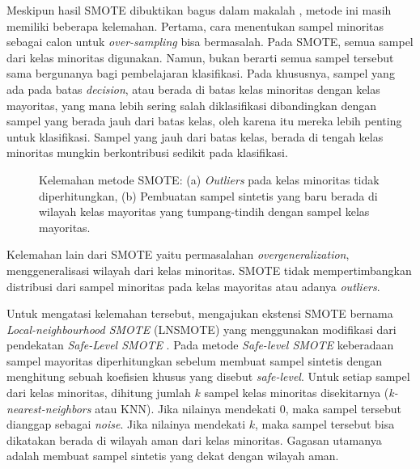 Meskipun hasil SMOTE dibuktikan bagus dalam makalah
\textcite{chawla2002smote}, metode ini masih memiliki beberapa kelemahan.
Pertama, cara menentukan sampel minoritas sebagai calon untuk
\textit{over-sampling} bisa bermasalah.
Pada SMOTE, semua sampel dari kelas minoritas digunakan.
Namun, bukan berarti semua sampel tersebut sama bergunanya bagi pembelajaran
klasifikasi.
Pada khususnya, sampel yang ada pada batas \textit{decision}, atau berada
di batas kelas minoritas dengan kelas mayoritas, yang mana lebih sering salah
diklasifikasi dibandingkan dengan sampel yang berada jauh dari batas kelas,
oleh karena itu mereka lebih penting untuk klasifikasi.
Sampel yang jauh dari batas kelas, berada di tengah kelas minoritas mungkin
berkontribusi sedikit pada klasifikasi.

\begin{figure}[htbp]
\centering
\setlength\fboxsep{4pt}
	\caption{
Kelemahan metode SMOTE:
(a) \textit{Outliers} pada kelas minoritas tidak diperhitungkan,
(b) Pembuatan sampel sintetis yang baru berada di wilayah kelas mayoritas
yang tumpang-tindih dengan sampel kelas mayoritas.
	}
	\label{fig:smote-problems}
\end{figure}

Kelemahan lain dari SMOTE yaitu permasalahan \textit{overgeneralization},
menggeneralisasi wilayah dari kelas minoritas.
SMOTE tidak mempertimbangkan distribusi dari sampel minoritas pada kelas
mayoritas atau adanya \textit{outliers}.

Untuk mengatasi kelemahan tersebut, \textcite{maciejewski2011local}
mengajukan ekstensi SMOTE bernama \textit{Local-neighbourhood
SMOTE} (LNSMOTE) yang menggunakan modifikasi dari pendekatan
\textit{Safe-Level SMOTE} \parencite{bunkhumpornpat2009safe}.
Pada metode \textit{Safe-level SMOTE} keberadaan sampel mayoritas
diperhitungkan sebelum membuat sampel sintetis dengan menghitung sebuah
koefisien khusus yang disebut \textit{safe-level}.
Untuk setiap sampel dari kelas minoritas, dihitung jumlah $k$ sampel kelas
minoritas disekitarnya (\textit{k-nearest-neighbors} atau KNN).
Jika nilainya mendekati $ 0 $, maka sampel tersebut dianggap sebagai
\textit{noise}.
Jika nilainya mendekati $ k $, maka sampel tersebut bisa dikatakan berada
di wilayah aman dari kelas minoritas.
Gagasan utamanya adalah membuat sampel sintetis yang dekat dengan wilayah aman.

